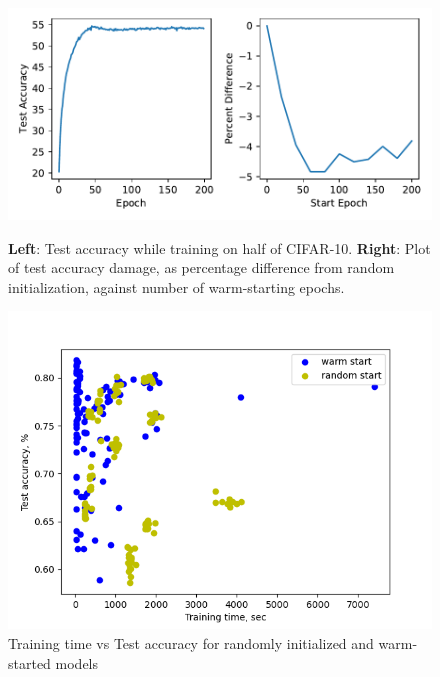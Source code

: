 \begin{figure}
\begin{minipage}[t]{.55\linewidth}
    \includegraphics[width=\linewidth]{figures/figure4.pdf}
    \caption{\textbf{Left}: Test accuracy while training on half of CIFAR-10. \textbf{Right}: Plot of test accuracy damage, as percentage difference from random initialization, against number of warm-starting epochs. }
    \label{fig:fig4-different-checkpoints}
\end{minipage}
\hfill
\begin{minipage}[t]{.4\linewidth}
    \includegraphics[width=\linewidth]{figures/fig3.png}
    \caption{Training time vs Test accuracy for randomly initialized and warm-started models}
    \label{fig:fig3-scatter} 
\end{minipage}
\end{figure}

